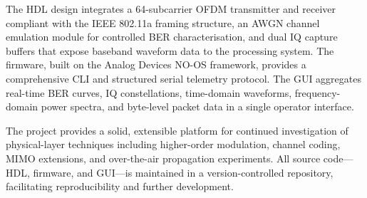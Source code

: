 \documentclass[12pt, a4paper, oneside]{report}
\begin{document}
The HDL design integrates a 64-subcarrier OFDM transmitter and receiver compliant with the IEEE 802.11a framing structure, an AWGN channel emulation module for controlled BER characterisation, and dual IQ capture buffers that expose baseband waveform data to the processing system. The firmware, built on the Analog Devices NO-OS framework, provides a comprehensive CLI and structured serial telemetry protocol. The GUI aggregates real-time BER curves, IQ constellations, time-domain waveforms, frequency-domain power spectra, and byte-level packet data in a single operator interface.

The project provides a solid, extensible platform for continued investigation of physical-layer techniques including higher-order modulation, channel coding, MIMO extensions, and over-the-air propagation experiments. All source code—HDL, firmware, and GUI—is maintained in a version-controlled repository, facilitating reproducibility and further development.
\end{document}
